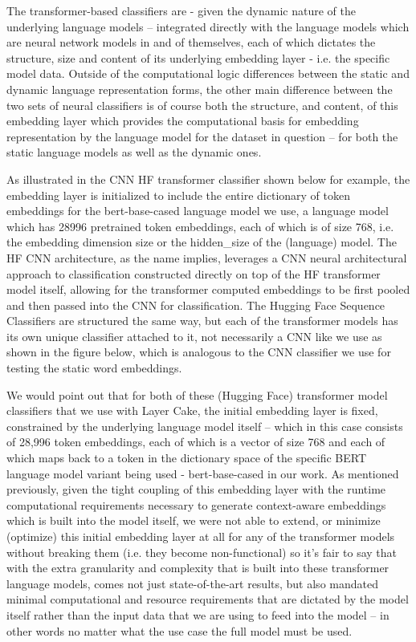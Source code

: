 \documentclass[final]{clv2025}
\begin{document}
The transformer-based classifiers are - given the dynamic nature of the underlying language models – integrated directly with the language models which are neural network models in and of themselves, each of which dictates the structure, size and content of its underlying embedding layer - i.e. the specific model data. Outside of the computational logic differences between the static and dynamic language representation forms, the other main difference between the two sets of neural classifiers is of course both the structure, and content, of this embedding layer which provides the computational basis for embedding representation by the language model for the dataset in question – for both the static language models as well as the dynamic ones. 

As illustrated in the CNN HF transformer classifier shown below for example, the embedding layer is initialized to include the entire dictionary of token embeddings for the bert-base-cased language model we use, a language model which has 28996 pretrained token embeddings, each of which is of size 768, i.e. the embedding dimension size or the hidden\_size of the (language) model. The HF CNN architecture, as the name implies, leverages a CNN neural architectural approach to classification constructed directly on top of the HF transformer model itself, allowing for the transformer computed embeddings to be first pooled and then passed into the CNN for classification. The Hugging Face Sequence Classifiers are structured the same way, but each of the transformer models has its own unique classifier attached to it, not necessarily a CNN like we use as shown in the figure below, which is analogous to the CNN classifier we use for testing the static word embeddings. 

We would point out that for both of these (Hugging Face) transformer model classifiers that we use with Layer Cake, the initial embedding layer is fixed, constrained by the underlying language model itself – which in this case consists of 28,996 token embeddings, each of which is a vector of size 768 and each of which maps back to a token in the dictionary space of the specific BERT language model variant being used - bert-base-cased in our work. As mentioned previously, given the tight coupling of this embedding layer with the runtime computational requirements necessary to generate context-aware embeddings which is built into the model itself, we were not able to extend, or minimize (optimize) this initial embedding layer at all for any of the transformer models without breaking them (i.e. they become non-functional) so it’s fair to say that with the extra granularity and complexity that is built into these transformer language models, comes not just state-of-the-art results, but also mandated minimal computational and resource requirements that are dictated by the model itself rather than the input data that we are using to feed into the model – in other words no matter what the use case the full model must be used. 
\end{document}

